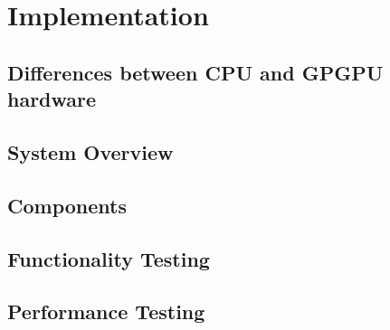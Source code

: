 \chapter{Implementation}
\section{Differences between \ac{CPU} and \ac{GPGPU} hardware}
\section{System Overview}

\section{Components}

\section{Functionality Testing}

\section{Performance Testing}
